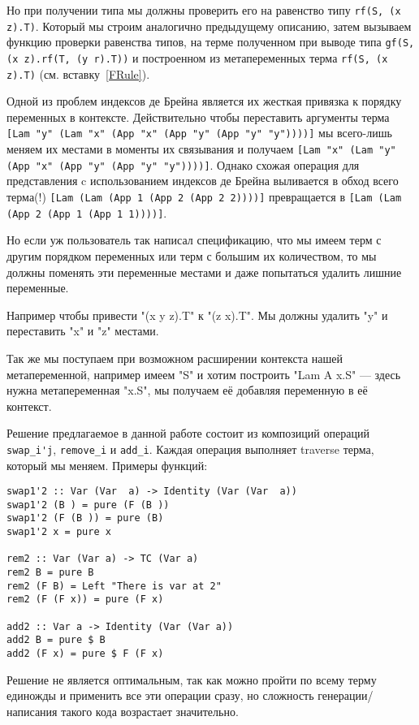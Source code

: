 Но при получении типа мы должны проверить его на равенство типу  \lstinline{rf(S, (x z).T)}. Который мы строим аналогично предыдущему описанию, затем вызываем функцию проверки равенства типов, на терме полученном при выводе типа \lstinline{gf(S, (x z).rf(T, (y r).T))} и построенном из метапеременных терма \lstinline{rf(S, (x z).T)} (см. вставку~\ref{FRule}).

\hfill

Одной из проблем индексов де Брейна является их жесткая привязка к порядку переменных в контексте. Действительно чтобы переставить аргументы терма \lstinline{[Lam "y" (Lam "x" (App "x" (App "y" (App "y" "y"))))]} мы всего-лишь меняем их местами в моменты их связывания и получаем \lstinline{[Lam "x" (Lam "y" (App "x" (App "y" (App "y" "y"))))]}. Однако схожая операция для представления c использованием индексов де Брейна выливается в обход всего терма(!) \lstinline{[Lam (Lam (App 1 (App 2 (App 2 2))))]} превращается в \lstinline{[Lam (Lam (App 2 (App 1 (App 1 1))))]}.

Но если уж пользователь так написал спецификацию, что мы имеем терм с другим порядком переменных или терм с большим их количеством, то мы должны поменять эти переменные местами и даже попытаться удалить лишние переменные.

Например чтобы привести "(x y z).T" к "(z x).T". Мы должны удалить "y" и переставить "x" и "z" местами.

Так же мы поступаем при возможном расширении контекста нашей метапеременной, например имеем "S" и хотим построить "Lam A x.S" --- здесь нужна метапеременная "x.S", мы получаем её добавляя переменную в её контекст.

Решение предлагаемое в данной работе состоит из композиций операций \lstinline{swap_i'j}, \lstinline{remove_i} и \lstinline{add_i}. Каждая операция выполняет traverse терма, который мы меняем. Примеры функций:

\begin{lstlisting}[frame=single]
swap1'2 :: Var (Var  a) -> Identity (Var (Var  a))
swap1'2 (B ) = pure (F (B ))
swap1'2 (F (B )) = pure (B)
swap1'2 x = pure x

rem2 :: Var (Var a) -> TC (Var a)
rem2 B = pure B
rem2 (F B) = Left "There is var at 2"
rem2 (F (F x)) = pure (F x)

add2 :: Var a -> Identity (Var (Var a))
add2 B = pure $ B
add2 (F x) = pure $ F (F x)
\end{lstlisting}

Решение не является оптимальным, так как можно пройти по всему терму единожды и применить все эти операции сразу, но сложность генерации/написания такого кода возрастает значительно.

